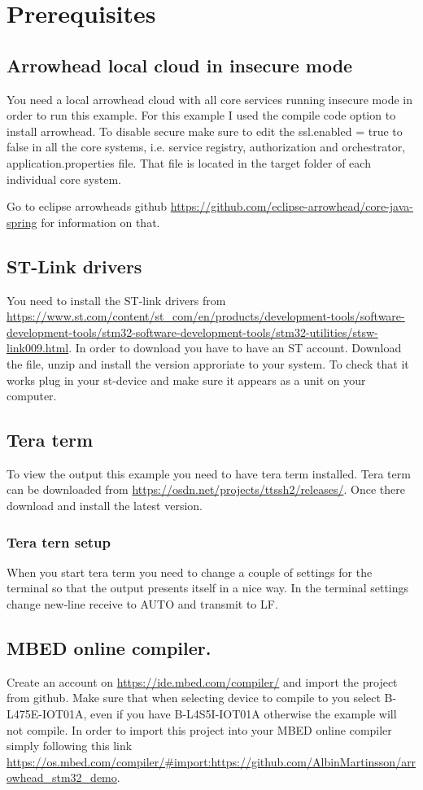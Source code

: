 \section*{Prerequisites}

\subsection*{Arrowhead local cloud in insecure mode}
You need a local arrowhead cloud with all core services running insecure mode in order to run this example. 
For this example I used the compile code option to install arrowhead. To disable secure make sure to edit the ssl.enabled = true to false in all the core systems, i.e. service registry, authorization and orchestrator, application.properties file. 
That file is located in the target folder of each individual core system. 

Go to eclipse arrowheads github \url{https://github.com/eclipse-arrowhead/core-java-spring} for information on that.

\subsection*{ST-Link drivers}
You need to install the ST-link drivers from \url{https://www.st.com/content/st_com/en/products/development-tools/software-development-tools/stm32-software-development-tools/stm32-utilities/stsw-link009.html}.
In order to download you have to have an ST account. 
Download the file, unzip and install the version approriate to your system. 
To check that it works plug in your st-device and make sure it appears as a unit on your computer.
\subsection*{Tera term}
To view the output this example you need to have tera term installed. Tera term can be downloaded from \url{https://osdn.net/projects/ttssh2/releases/}.
Once there download and install the latest version. 
\subsubsection*{Tera tern setup}
When you start tera term you need to change a couple of settings for the terminal so that the output presents itself in a nice way. In the terminal settings change new-line receive to AUTO and transmit to LF. 
\subsection*{MBED online compiler.}
Create an account on \url{https://ide.mbed.com/compiler/} and import the project from github.
Make sure that when selecting device to compile to you select B-L475E-IOT01A, even if you have B-L4S5I-IOT01A otherwise the example will not compile.
In order to import this project into your MBED online compiler simply following this link \url{https://os.mbed.com/compiler/#import:https://github.com/AlbinMartinsson/arrowhead_stm32_demo}. 


